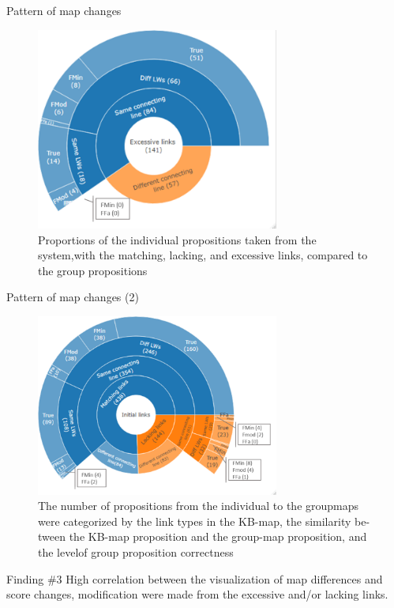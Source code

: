 \begin{frame}{Pattern of map changes}
    \begin{figure}[tb]
    \begin{center}
        \includegraphics[width=80mm]{images/rqa_map_patterns_a.pdf}
    \end{center}
    \caption{Proportions of the individual propositions taken from the system,with  the  matching,  lacking,  and  excessive  links,  compared  to  the  group propositions}
    \label{a1::map_sample_1}
\end{figure}
\end{frame}


\begin{frame}{Pattern of map changes (2)}
    \begin{figure}[tb]
    \begin{center}
        \includegraphics[width=80mm]{images/rqa_map_patterns_b.pdf}
    \end{center}
    \caption{The  number  of  propositions  from  the  individual  to  the  groupmaps were categorized by the link types in the KB-map, the similarity be-tween the KB-map proposition and the group-map proposition, and the levelof group proposition correctness}
    \label{a1::map_sample_2}
\end{figure}
\begin{block}{Finding \#3}
    High correlation between the visualization of map differences
    and score changes, modification were made
    from the excessive and/or lacking links. 
\end{block}

\end{frame}
